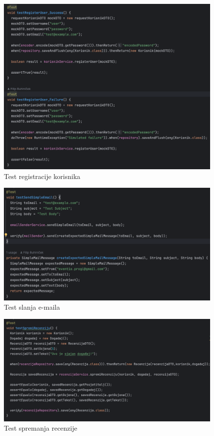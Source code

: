 			
			\begin{figure}[H]
				\includegraphics[scale=0.45]{testovi/korisnikTest.png}
				\centering
				\caption{Test registracije korisnika}
				\label{fig:promjene}
			\end{figure}
			
			
			
			\begin{figure}[H]
				\includegraphics[scale=0.45]{testovi/emailTest.png}
				\centering
				\caption{Test slanja e-maila}
				\label{fig:promjene}
			\end{figure}
			
			\begin{figure}[H]
				\includegraphics[scale=0.45]{testovi/recenzijeTest.png}
				\centering
				\caption{Test spremanja recenzije}
				\label{fig:promjene}
			\end{figure}
			
